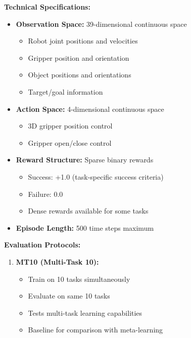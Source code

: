 \documentclass[12pt]{article}
\newcommand{\ieee}[1]{\textcolor{IEEEBlue}{\textbf{#1}}}
\begin{document}
{{			\ieee{Technical Specifications:}
			
			\begin{itemize}
				\item \textbf{Observation Space:} 39-dimensional continuous space
				\begin{itemize}
					\item Robot joint positions and velocities
					\item Gripper position and orientation
					\item Object positions and orientations
					\item Target/goal information
				\end{itemize}
				
				\item \textbf{Action Space:} 4-dimensional continuous space
				\begin{itemize}
					\item 3D gripper position control
					\item Gripper open/close control
				\end{itemize}
				
				\item \textbf{Reward Structure:} Sparse binary rewards
				\begin{itemize}
					\item Success: +1.0 (task-specific success criteria)
					\item Failure: 0.0
					\item Dense rewards available for some tasks
				\end{itemize}
				
				\item \textbf{Episode Length:} 500 time steps maximum
			\end{itemize}
			
			\ieee{Evaluation Protocols:}
			
			\begin{enumerate}
				\item \textbf{MT10 (Multi-Task 10):}
				\begin{itemize}
					\item Train on 10 tasks simultaneously
					\item Evaluate on same 10 tasks
					\item Tests multi-task learning capabilities
					\item Baseline for comparison with meta-learning
				\end{itemize}
				

\end{enumerate}}}
\end{document}
